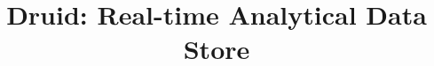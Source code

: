 \documentclass{vldb}
\begin{document}

\title{Druid: Real-time Analytical Data Store}



%
%
%
%

\end{document}

